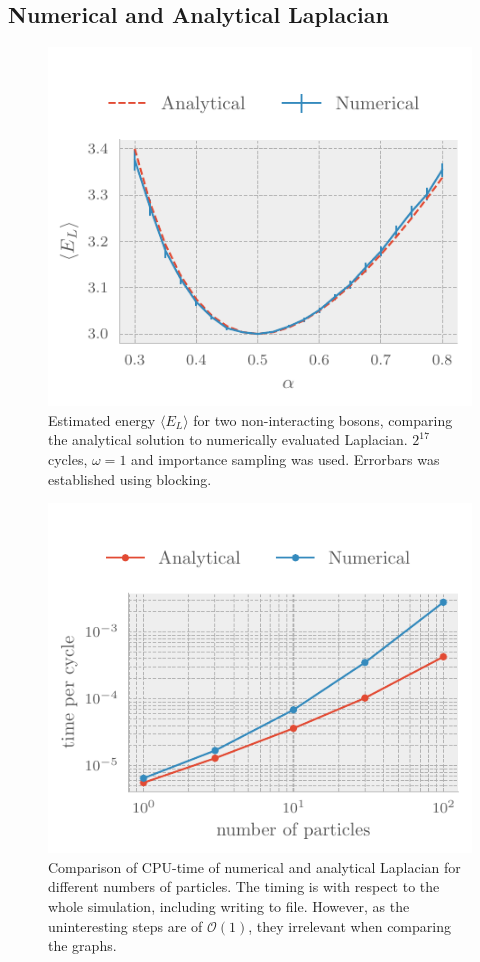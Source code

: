 \subsection{Numerical and Analytical Laplacian}
\begin{figure}[ht]
	\includegraphics[]{figures/numericalLap.pdf}
	\centering
	\caption{Estimated energy $\langle E_{L} \rangle$ for two non-interacting
      bosons, comparing the analytical solution to numerically evaluated
      Laplacian. $2^{17}$ cycles, $\omega = 1$ and importance sampling was used. Errorbars was established using blocking. }
	\label{fig:numerical lap}
\end{figure}

\begin{figure}[ht]
	\includegraphics[]{figures/numericalTime.pdf}
	\centering
	\caption{Comparison of CPU-time of numerical and analytical Laplacian for
      different numbers of particles. The timing is with respect to the whole
      simulation, including writing to file. However, as the uninteresting steps
    are of \(\mathcal{O}(1)\), they irrelevant when comparing the graphs.}
	\label{fig:numerical time}
\end{figure}

